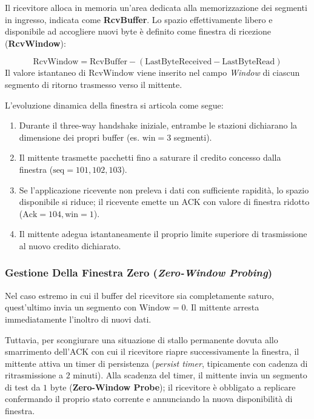 \documentclass[11pt, a4paper]{article}
\begin{document}
Il ricevitore alloca in memoria un'area dedicata alla memorizzazione dei segmenti in ingresso, indicata come \textbf{RcvBuffer}. Lo spazio effettivamente libero e disponibile ad accogliere nuovi byte è definito come finestra di ricezione (\textbf{RcvWindow}):


\[
    \text{RcvWindow} = \text{RcvBuffer} - \left( \text{LastByteReceived} - \text{LastByteRead} \right)
\]
Il valore istantaneo di $\text{RcvWindow}$ viene inserito nel campo \emph{Window} di ciascun segmento di ritorno trasmesso verso il mittente.


L'evoluzione dinamica della finestra si articola come segue:
\begin{enumerate}[noitemsep]
    \item Durante il three-way handshake iniziale, entrambe le stazioni dichiarano la dimensione dei propri buffer (es. $\text{win}=3$ segmenti).
    \item Il mittente trasmette pacchetti fino a saturare il credito concesso dalla finestra ($\text{seq}=101, 102, 103$).
    \item Se l'applicazione ricevente non preleva i dati con sufficiente rapidità, lo spazio disponibile si riduce; il ricevente emette un ACK con valore di finestra ridotto ($\text{Ack}=104, \text{win}=1$).
    \item Il mittente adegua istantaneamente il proprio limite superiore di trasmissione al nuovo credito dichiarato.
\end{enumerate}

\subsubsection{Gestione Della Finestra Zero (\emph{Zero-Window Probing})}
Nel caso estremo in cui il buffer del ricevitore sia completamente saturo, quest'ultimo invia un segmento con $\text{Window} = 0$. Il mittente arresta immediatamente l'inoltro di nuovi dati.

Tuttavia, per scongiurare una situazione di stallo permanente dovuta allo smarrimento dell'ACK con cui il ricevitore riapre successivamente la finestra, il mittente attiva un timer di persistenza (\emph{persist timer}, tipicamente con cadenza di ritrasmissione a $2\text{ minuti}$). Alla scadenza del timer, il mittente invia un segmento di test da $1\text{ byte}$ (\textbf{Zero-Window Probe}); il ricevitore è obbligato a replicare confermando il proprio stato corrente e annunciando la nuova disponibilità di finestra.
\end{document}

